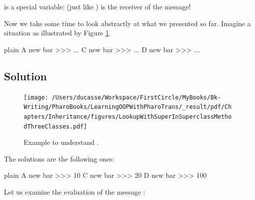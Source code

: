 \documentclass[10pt,twoside,english]{_support/latex/sbabook/sbabook}
\begin{document}
\begin{important}
 is a special variable:  (just like ) is the receiver of the message! 
\end{important}

Now we take some time to look abstractly at what we presented so far. 
Imagine a situation as illustrated by Figure \ref{fig:LookupWithSuperInSuperclassMethodThreeClasses}.

\begin{displaycode}{plain}
A new bar
>>> ...
C new bar
>>> ...
D new bar
>>> ...
\end{displaycode}
\subsection{Solution }

\begin{figure}

\begin{center}
\texttt{[image: /Users/ducasse/Workspace/FirstCircle/MyBooks/Bk-Writing/PharoBooks/LearningOOPWithPharoTrans/\_result/pdf/Chapters/Inheritance/figures/LookupWithSuperInSuperclassMethodThreeClasses.pdf]}\caption{Example to understand .\label{fig:LookupWithSuperInSuperclassMethodThreeClasses}}\end{center}
\end{figure}


The solutions are the following ones:

\begin{displaycode}{plain}
A new bar
>>> 10
C new bar
>>> 20
D new bar
>>> 100
\end{displaycode}

Let us examine the evaluation of the message : 
\end{document}
